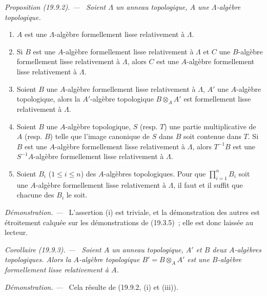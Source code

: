 \documentclass[10pt,oneside]{book}
\makeatletter
\newcommand{\setmanualcurrentlabel}[1]{\def\@currentlabel{#1}}
\newenvironment{proposition}[1][]{%
  \setmanualcurrentlabel{#1}\par\medskip\noindent\itshape Proposition (#1). ---\ }{\par}
\newenvironment{corollary}[1][]{%
  \setmanualcurrentlabel{#1}\par\medskip\noindent\itshape Corollaire (#1). ---\ }{\par}
\newenvironment{proof}{%
  \par\medskip\noindent\textit{Démonstration. ---\ }}{\par}
\makeatother
\begin{document}
\begin{proposition}[19.9.2]
\label{0.19.9.2-fr}
Soient $\Lambda$ un anneau topologique, $A$ une $\Lambda$-algèbre topologique.
\begin{enumerate}
  \item[(i)] $A$ est une $\Lambda$-algèbre formellement lisse relativement à
  $\Lambda$.
  \item[(ii)] Si $B$ est une $A$-algèbre formellement lisse relativement à
  $\Lambda$ et $C$ une $B$-algèbre formellement lisse relativement à
  $\Lambda$, alors $C$ est une $A$-algèbre formellement lisse relativement à
  $\Lambda$.
  \item[(iii)] Soient $B$ une $A$-algèbre formellement lisse relativement à
  $\Lambda$, $A'$ une $A$-algèbre topologique, alors la $A'$-algèbre
  topologique $B\otimes_A A'$ est formellement lisse relativement à $\Lambda$.
  \item[(iv)] Soient $B$ une $A$-algèbre topologique, $S$ (resp. $T$) une
  partie multiplicative de $A$ (resp. $B$) telle que l'image canonique de $S$
  dans $B$ soit contenue dans $T$. Si $B$ est une $A$-algèbre formellement
  lisse relativement à $\Lambda$, alors $T^{-1}B$ est une $S^{-1}A$-algèbre
  formellement lisse relativement à $\Lambda$.
  \item[(v)] Soient $B_i$ ($1\leq i\leq n$) des $A$-algèbres topologiques.
  Pour que $\prod_{i=1}^n B_i$ soit une $A$-algèbre formellement lisse
  relativement à $\Lambda$, il faut et il suffit que chacune des $B_i$ le
  soit.
\end{enumerate}
\end{proposition}

\begin{proof}
L'assertion (i) est triviale, et la démonstration des autres est étroitement
calquée sur les démonstrations de (19.3.5)~; elle est donc laissée au lecteur.
\end{proof}

\begin{corollary}[19.9.3]
\label{0.19.9.3-fr}
Soient $A$ un anneau topologique, $A'$ et $B$ deux $A$-algèbres topologiques.
Alors la $A$-algèbre topologique $B'=B\otimes_A A'$ est une $B$-algèbre
formellement lisse relativement à $A$.
\end{corollary}

\begin{proof}
Cela résulte de (19.9.2, (i) et (iii)).
\end{proof}
\end{document}
